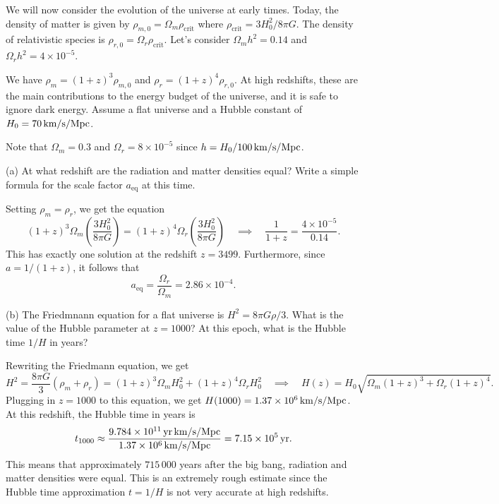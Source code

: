 \documentclass{lkx_pset}
\begin{document}
\begin{problem}{2}
We will now consider the evolution of the universe at early times. Today, the density of matter is given by $\rho_{m,0}=\Omega_m \rho_{\textrm{crit}}$ where $\rho_{\textrm{crit}}=3H_0^2/8\pi G$. The density of relativistic species is $\rho_{r,0}=\Omega_r \rho_{\textrm{crit}}$.
Let's consider $\Omega_m h^2 = 0.14$ and $\Omega_r h^2 = 4\times 10^{-5}$.
\end{problem}
\begin{parts}
	\begin{part}{}
		We have $\rho_m=(1+z)^3\rho_{m,0}$ and $\rho_r= (1+z)^4\rho_{r,0}$. At high redshifts, these are the main contributions to the energy budget of the universe, and it is safe to ignore dark energy. Assume a flat universe and a Hubble constant of $H_0=\Hsi{70}$.
	\end{part}
  Note that $\Omega_m= 0.3$ and $\Omega_r = 8\times 10^{-5}$ since $h = H_0/\Hsi{100}$.

	\begin{part}{(a)}
		At what redshift are the radiation and matter densities equal? Write a simple formula for the scale factor $a_{\textrm{eq}}$ at this time.
	\end{part}
	Setting $\rho_m = \rho_r$, we get the equation
	\[
		(1+z)^3 \Omega_m \left(\frac{3H_0^2}{8\pi G}\right)
		=
		(1+z)^4 \Omega_r \left(\frac{3H_0^2}{8\pi G}\right)
		\quad\implies\quad \frac{1}{1+z} = \frac{4\times 10^{-5}}{0.14}.
	\]
	This has exactly one solution at the redshift $z=3499$. Furthermore, since $a=1/(1+z)$, it follows that
	\[
    a_{\textrm{eq}} = \frac{\Omega_r}{\Omega_m} = 2.86\times 10^{-4}.
	\]

  \begin{part}{(b)}
    The Friedmnann equation for a flat universe is $H^2=8\pi G\rho/3$. What is the value of the Hubble parameter at $z=1000$? At this epoch, what is the Hubble time $1/H$ in years?
  \end{part}
  Rewriting the Friedmann equation, we get
  \[
    H^2 = \frac{8\pi G}{3}\left(\rho_m + \rho_r\right) = (1+z)^3 \Omega_m H_0^2 + (1+z)^4 \Omega_r H_0^2\quad\implies\quad H(z)=H_0\sqrt{\Omega_m(1+z)^3+\Omega_r(1+z)^4}.
  \]
  Plugging in $z=1000$ to this equation, we get $H(1000) = \Hsi{1.37e6}$. At this redshift, the Hubble time in years is 
  \[
    t_{1000} \approx \frac{\Hyrsi{9.784e11}}{\Hsi{1.37e6}} = \yrsi{7.15e5}.
  \]
  This means that approximately $715\,000$ years after the big bang, radiation and matter densities were equal. This is an extremely rough estimate since the Hubble time approximation $t=1/H$ is not very accurate at high redshifts.


\end{parts}
\end{document}
